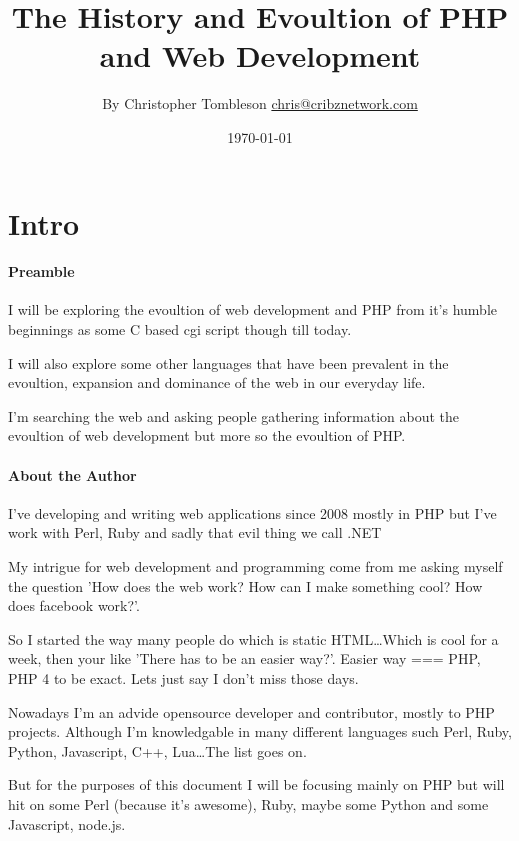 \documentclass{book}
\begin{document}
\title{The History and Evoultion of PHP and Web Development}
\author{By Christopher Tombleson \href{mailto:chris@cribznetwork.com}{chris@cribznetwork.com}}
\date{\today}
\maketitle

\chapter{Intro}
\subsubsection{Preamble}
I will be exploring the evoultion of web development and PHP from it's humble beginnings as some C based cgi script though till today.

I will also explore some other languages that have been prevalent in the evoultion, expansion and dominance of the web in our everyday life.

I'm searching the web and asking people gathering information about the evoultion of web development but more so the evoultion of PHP.

\subsubsection{About the Author}

I've developing and writing web applications since 2008 mostly in PHP but I've work with Perl, Ruby and sadly that evil thing we call .NET

My intrigue for web development and programming come from me asking myself the question 'How does the web work? How can I make something cool? How does facebook work?'.

So I started the way many people do which is static HTML\ldots{}Which is cool for a week, then your like 'There has to be an easier way?'. Easier way === PHP, PHP 4 to be exact. Lets just say I don't miss those days.

Nowadays I'm an advide opensource developer and contributor, mostly to PHP projects. Although I'm knowledgable in many different languages such Perl, Ruby, Python, Javascript, C++, Lua\ldots{}The list goes on.

But for the purposes of this document I will be focusing mainly on PHP but will hit on some Perl (because it's awesome), Ruby, maybe some Python and some Javascript, node.js.
\end{document}
